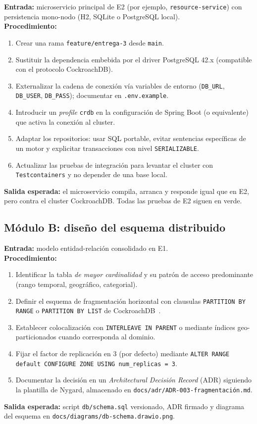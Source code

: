 \documentclass[11pt,a4paper]{article}
\begin{document}
    \textbf{Entrada:} microservicio principal de E2 (por ejemplo, \texttt{resource-service}) con persistencia mono-nodo (H2, SQLite o PostgreSQL local).\\
    \textbf{Procedimiento:}
    \begin{enumerate}
        \item Crear una rama \texttt{feature/entrega-3} desde \texttt{main}.
        \item Sustituir la dependencia embebida por el driver PostgreSQL 42.x (compatible con el protocolo CockroachDB).
        \item Externalizar la cadena de conexión vía variables de entorno (\texttt{DB\_URL}, \texttt{DB\_USER}, \texttt{DB\_PASS}); documentar en \texttt{.env.example}.
        \item Introducir un \emph{profile} \texttt{crdb} en la configuración de Spring Boot (o equivalente) que activa la conexión al cluster.
        \item Adaptar los repositorios: usar SQL portable, evitar sentencias específicas de un motor y explicitar transacciones con nivel \texttt{SERIALIZABLE}.
        \item Actualizar las pruebas de integración para levantar el cluster con \texttt{Testcontainers} y no depender de una base local.
    \end{enumerate}
    \textbf{Salida esperada:} el microservicio compila, arranca y responde igual que en E2, pero contra el cluster CockroachDB. Todas las pruebas de E2 siguen en verde.

\subsection{Módulo B: diseño del esquema distribuido}

    \textbf{Entrada:} modelo entidad-relación consolidado en E1.\\
    \textbf{Procedimiento:}
    \begin{enumerate}
        \item Identificar la tabla \emph{de mayor cardinalidad} y su patrón de acceso predominante (rango temporal, geográfico, categorial).
        \item Definir el esquema de fragmentación horizontal con clausulas \texttt{PARTITION BY RANGE} o \texttt{PARTITION BY LIST} de CockroachDB~\cite{CockroachDocs2024}.
        \item Establecer colocalización con \texttt{INTERLEAVE IN PARENT} o mediante índices geo-particionados cuando corresponda al dominio.
        \item Fijar el factor de replicación en 3 (por defecto) mediante \texttt{ALTER RANGE default CONFIGURE ZONE USING num\_replicas = 3}.
        \item Documentar la decisión en un \emph{Architectural Decisión Record} (ADR) siguiendo la plantilla de Nygard, almacenado en \texttt{docs/adr/ADR-003-fragmentación.md}.
    \end{enumerate}
    \textbf{Salida esperada:} script \texttt{db/schema.sql} versionado, ADR firmado y diagrama del esquema en \texttt{docs/diagrams/db-schema.drawio.png}.
\end{document}
